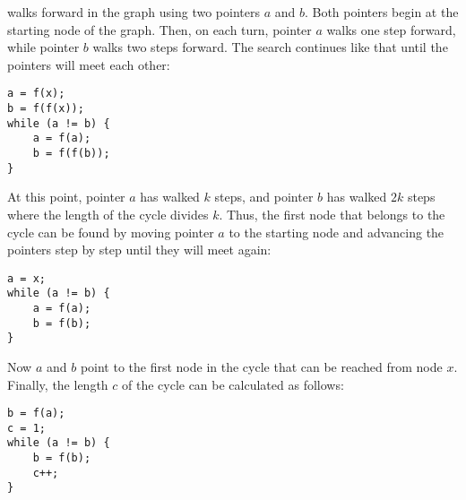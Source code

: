 
 walks forward 
in the graph using two pointers $a$ and $b$.
Both pointers begin at the starting node
of the graph.
Then, on each turn, pointer $a$ walks
one step forward, while pointer $b$
walks two steps forward.
The search continues like that until
the pointers will meet each other:

\begin{lstlisting}
a = f(x);
b = f(f(x));
while (a != b) {
    a = f(a);
    b = f(f(b));
}
\end{lstlisting}

At this point, pointer $a$ has walked $k$ steps,
and pointer $b$ has walked $2k$ steps
where the length of the cycle divides $k$.
Thus, the first node that belongs to the cycle
can be found by moving pointer $a$ to the
starting node and advancing the pointers
step by step until they will meet again:

\begin{lstlisting}
a = x;
while (a != b) {
    a = f(a);
    b = f(b);
}
\end{lstlisting}

Now $a$ and $b$ point to the first node in the cycle
that can be reached from node $x$.
Finally, the length $c$ of the cycle
can be calculated as follows:

\begin{lstlisting}
b = f(a);
c = 1;
while (a != b) {
    b = f(b);
    c++;
}
\end{lstlisting}
% 
% 
% 
% 
% 
% 
% 
% 

